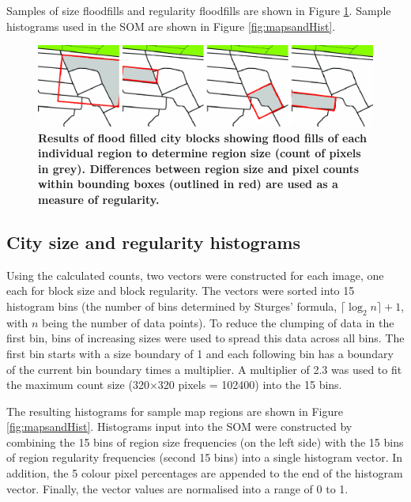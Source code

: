 \documentclass[9pt,twocolumn,twoside,lineno]{pnas-new}
\begin{document}
{Samples of size floodfills and regularity floodfills are shown in Figure \ref{fig:floodfilled}. Sample histograms used in the SOM are shown in Figure \ref{fig:mapsandHist}.

\begin{figure}
\centering
 \includegraphics[trim={0 0 0 0},clip,scale=0.15]{BlockTypologies_Figures2-5.png}
\caption{\bf Results of flood filled city blocks showing flood fills of each individual region to determine region size (count of pixels in grey). Differences between region size and pixel counts within bounding boxes (outlined in red) are used as a measure of regularity.}
 \label{fig:floodfilled}
\end{figure} 

\subsection*{City size and regularity histograms}\label{methodshist}

Using the calculated counts, two vectors were constructed for each image, one each for block size and block regularity. The vectors were sorted into 15 histogram bins (the number of bins determined by Sturges' formula\cite{Sturges1926}, $\lceil \log_{2}n \rceil +1$, with $n$ being the number of data points). To reduce the clumping of data in the first bin, bins of increasing sizes were used to spread this data across all bins. The first bin starts with a size boundary of 1 and each following bin has a boundary of the current bin boundary times a multiplier. A multiplier of 2.3 was used to fit the maximum count size (320$\times$320 pixels = 102400) into the 15 bins.

The resulting histograms for sample map regions are shown in Figure \ref{fig:mapsandHist}. Histograms input into the SOM were constructed by combining the 15 bins of region size frequencies (on the left side) with the 15 bins of region regularity frequencies (second 15 bins) into a single histogram vector. In addition, the 5 colour pixel percentages are appended to the end of the histogram vector. Finally, the vector values are normalised into a range of 0 to 1.


}
\end{document}

